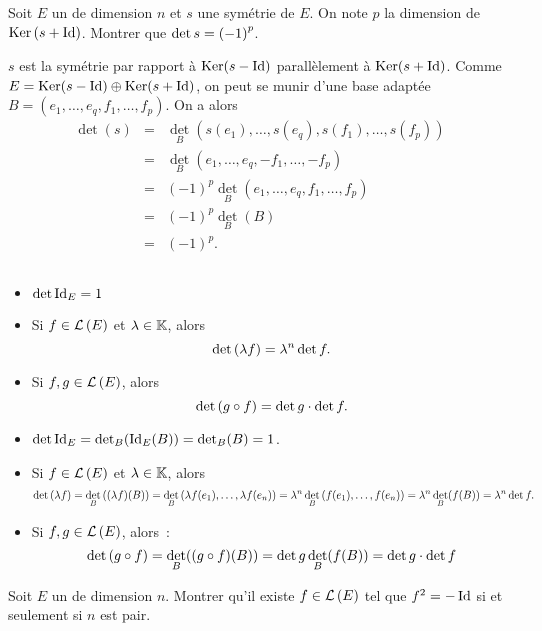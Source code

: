 \documentclass{magnolia}
\begin{document}
\begin{exoUnique}
\exo Soit $E$ un \Kev de dimension $n$ et $s$ une symétrie de $E$. On note
  $p$ la dimension de $\mathop{\rm Ker}\left(s+\operatorname{Id}\right)$. Montrer que $\mathop{\rm det} s=\left(-1\right)^p$.
\end{exoUnique}

\begin{sol}
$s$ est la symétrie par rapport à $\mathop{\rm Ker}(s-\operatorname{Id})$ parallèlement à $\mathop{\rm Ker}(s+\operatorname{Id})$. Comme $E=\mathop{\rm Ker}(s-\operatorname{Id})\oplus \mathop{\rm Ker}(s+\operatorname{Id})$, on peut se munir d'une base adaptée $B=(e_1,\ldots,e_q,f_1,\ldots,f_p)$. On a alors
\begin{eqnarray*}
\det(s)&=&\det_B(s(e_1),\ldots,s(e_q),s(f_1),\ldots,s(f_p))\\
&=&\det_B(e_1,\ldots,e_q,-f_1,\ldots,-f_p)\\
&=&(-1)^p\det_B(e_1,\ldots,e_q,f_1,\ldots,f_p)\\
&=&(-1)^p\det_B(B)\\
&=&(-1)^p.
\end{eqnarray*}
\end{sol}

\begin{proposition}
$\quad$
\begin{itemize}
\item $\mathop{\rm det} \operatorname{Id}_E=1$
\item Si $f\in\mathcal{L}\left(E\right)$ et $\lambda\in\mathbb{K}$, alors
  \[\mathop{\rm det}\left(\lambda f\right)=\lambda^n \mathop{\rm det} f.\]
\item Si $f,g\in\mathcal{L}\left(E\right)$, alors
  \[\mathop{\rm det}\left(g\circ f\right)=\mathop{\rm det} g\cdot \mathop{\rm det} f.\]
\end{itemize}
\end{proposition}

\begin{preuve}
\begin{itemize}
\item $\mathop{\rm det} \operatorname{Id}_E=\mathop{\rm det}_B(\operatorname{Id}_E(B))=\mathop{\rm det}_B(B)=1$.
\item Si $f\in\mathcal{L}\left(E\right)$ et $\lambda\in\mathbb{K}$, alors
  \[\mathop{\rm det}\left(\lambda f\right)=\mathop{\rm det}_B\left((\lambda f)(B)\right)=\mathop{\rm det}_B\left(\lambda f(e_1),\ldots,\lambda f(e_n)\right)=\lambda^n\mathop{\rm det}_B\left(f(e_1),\ldots, f(e_n)\right)=\lambda^n\mathop{\rm det}_B(f(B))=\lambda^n \mathop{\rm det} f.\]
\item Si $f,g\in\mathcal{L}\left(E\right)$, alors~:
  \[\mathop{\rm det}\left(g\circ f\right)=\mathop{\rm det}_B((g\circ f)(B))=\mathop{\rm det} g \mathop{\rm det}_B(f(B))=\mathop{\rm det} g\cdot \mathop{\rm det} f\]
\end{itemize}
\end{preuve}


\begin{exoUnique}
\exo Soit $E$ un \Rev de dimension $n$. Montrer qu'il existe $f\in\mathcal{L}\left(E\right)$
  tel que $f^2=-\operatorname{Id}$ si et seulement si $n$ est pair.
\end{exoUnique}
\end{document}
